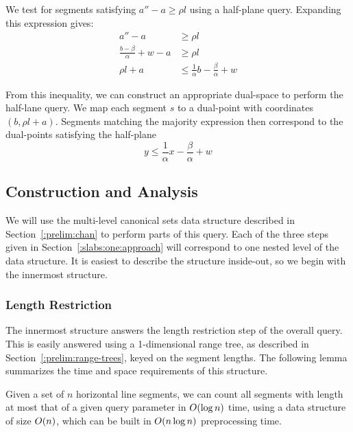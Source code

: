 We test for segments satisfying $a'' - a \geq \rho l$ using a half-plane query.  Expanding this expression gives:
\[
\begin{split}
a'' - a &\geq \rho l \\
%
\frac{b - \beta}{\alpha} + w - a &\geq \rho l \\
%
\rho l + a &\leq \frac{1}{\alpha} b - \frac{\beta}{\alpha} + w
%
\end{split}
\]

From this inequality, we can construct an appropriate dual-space to perform the half-lane query.  We map each segment $s$ to a dual-point with coordinates $(b, \rho l + a)$. Segments matching the majority expression then correspond to the dual-points satisfying the half-plane 
\[
y \leq \frac{1}{\alpha} x - \frac{\beta}{\alpha} + w
\]

\subsection{Construction and Analysis}
\label{:slabs:one:analysis}

We will use the multi-level canonical sets data structure described in Section~\ref{:prelim:chan} to perform parts of this query.
Each of the three steps given in Section~\ref{:slabs:one:approach} will correspond to one nested level of the data structure.
It is easiest to describe the structure inside-out, so we begin with the innermost structure.


\subsubsection{Length Restriction}

The innermost structure answers the length restriction step of the overall query. This is easily answered using a 1-dimensional range tree, as described in Section~\ref{:prelim:range-trees}, keyed on the segment lengths. The following lemma summarizes the time and space requirements of this structure.

\begin{lemma}
\label{lem:slabs:one:step1}
Given a set of $n$ horizontal line segments, we can count all segments with length at most that of a given query parameter in $O\!\left(\log{n}\right)$ time, using a data structure of size $O\!\left(n\right)$, which can be built in $O\!\left(n \log{n}\right)$ preprocessing time.
\end{lemma}


